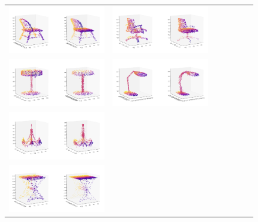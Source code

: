 \documentclass[12pt]{article}
\begin{document}
    \begin{figure}
        \centering
        \begin{tabular}{lllllll}
            \includegraphics[width = 60mm]{chair_ae_1} &
            \includegraphics[width = 60mm]{chair_ae_2} \\
            \includegraphics[width = 60mm]{lamp_ae_1} &
            \includegraphics[width = 60mm]{lamp_ae_2} \\
            \includegraphics[width = 60mm]{lamp_ae_3} \\
            \includegraphics[width = 60mm]{table_ae_1} &

\end{tabular}
\end{figure}
\end{document}
